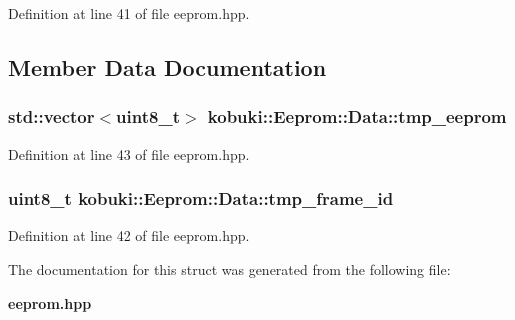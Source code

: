 \-Definition at line 41 of file eeprom.\-hpp.



\subsection{\-Member \-Data \-Documentation}
\subsubsection[{tmp\-\_\-eeprom}]{\setlength{\rightskip}{0pt plus 5cm}std\-::vector$<$uint8\-\_\-t$>$ {\bf kobuki\-::\-Eeprom\-::\-Data\-::tmp\-\_\-eeprom}}\label{structkobuki_1_1Eeprom_1_1Data_a40259e53d69c4e01c95fbefceb66a371}


\-Definition at line 43 of file eeprom.\-hpp.

\subsubsection[{tmp\-\_\-frame\-\_\-id}]{\setlength{\rightskip}{0pt plus 5cm}uint8\-\_\-t {\bf kobuki\-::\-Eeprom\-::\-Data\-::tmp\-\_\-frame\-\_\-id}}\label{structkobuki_1_1Eeprom_1_1Data_a49fd4240664c5ece3ce78c38144c6e2c}


\-Definition at line 42 of file eeprom.\-hpp.



\-The documentation for this struct was generated from the following file\-:\begin{DoxyCompactItemize}
\item 
{\bf eeprom.\-hpp}\end{DoxyCompactItemize}
